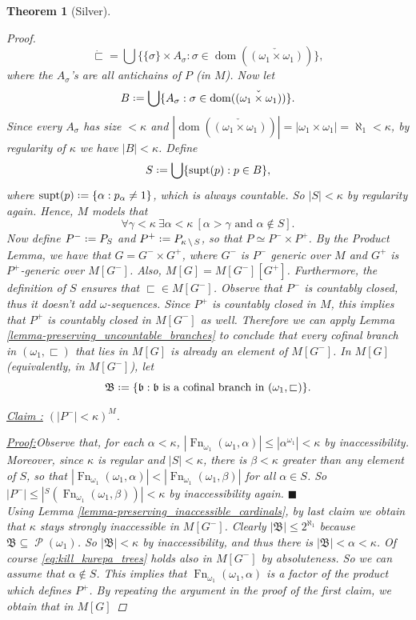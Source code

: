 \documentclass[11pt,a4paper]{report}
\newtheorem{theorem}{Theorem}[chapter] %
\theoremstyle{definition}
\theoremstyle{num.custom-title}
\theoremstyle{custom-title}
\newenvironment{claim}[1]{\par\noindent\underline{Claim#1:}\space}{} %
\newenvironment{claimproof}[1]{\par\noindent\underline{Proof:}\space#1}{\leavevmode\unskip\penalty9999 \hbox{}\nobreak\hfill\quad\hbox{$\blacksquare$}} %
\DeclareMathOperator{\dom}{dom}
\DeclareMathOperator{\PP}{\mathcal{P}}
\DeclareMathOperator{\sm}{\setminus}
\DeclareMathOperator{\sse}{\subseteq}
\DeclareMathOperator{\Fn}{Fn}
\newcommand*{\defeq}{\mathrel{\rlap{%
                     \raisebox{0.3ex}{$\cdot$}}%
                     \raisebox{-0.3ex}{$\cdot$}}%
                     =}
\begin{document}
\begin{theorem}[Silver]
\begin{proof}
\[
\dot{\sqsubset} = 
\bigcup \big\{ \{\sigma\} \times A_\sigma : \sigma \in \dom(\check{(\omega_1 \times \omega_1)}) \big\},
\]
where the $A_\sigma$'s are all antichains of $P$ (in $M$). Now let 
\[
B \defeq \bigcup \{A_\sigma : \sigma \in \dom(\check{(\omega_1 \times \omega_1)}) \}.
\]
Since every $A_\sigma$ has size $<\kappa$ and $|\dom(\check{(\omega_1 \times \omega_1)})| = |\omega_1 \times \omega_1| = \aleph_1 < \kappa$, by regularity of $\kappa$ we have $|B| < \kappa$. Define
\[
S \defeq \bigcup \{ \supt(p) : p \in B \},
\]
where $\supt(p) \defeq \{\alpha : p_\alpha \neq 1\}$, which is always countable. So $|S| < \kappa$ by regularity again. Hence, $M$ models that
\begin{equation}\label{eq:kill_kurepa_trees}
\forall \gamma < \kappa \ \exists \alpha < \kappa \ [\alpha > \gamma \text{ and } \alpha \not\in S].
\end{equation}
Now define $P^- \defeq P_S$ and $P^+ \defeq P_{\kappa \sm S}$, so that $P \simeq P^- \times P^+$. By the Product Lemma, we have that $G = G^- \times G^+$, where $G^-$ is $P^-$ generic over $M$ and $G^+$ is $P^+$-generic over $M[G^-]$. Also, $M[G] = M[G^-][G^+]$. Furthermore, the definition of $S$ ensures that ${\sqsubset} \in M[G^-]$. Observe that $P^-$ is countably closed, thus it doesn't add $\omega$-sequences. Since $P^+$ is countably closed in $M$, this implies that $P^+$ is countably closed in $M[G^-]$ as well. Therefore we can apply Lemma \ref{lemma-preserving_uncountable_branches} to conclude that every cofinal branch in $(\omega_1,\sqsubset)$ that lies in $M[G]$ is already an element of $M[G^-]$. In $M[G]$ (equivalently, in $M[G^-]$), let
\[
\mathfrak{B} \defeq \{ \mathfrak{b} : \mathfrak{b} \text{ is a cofinal branch in } (\omega_1,\sqsubset) \}.
\]
\begin{claim}{ }
$(|P^-| < \kappa)^M$.
\begin{claimproof}
Observe that, for each $\alpha < \kappa$, $|\Fn_{\omega_1}(\omega_1,\alpha)| \leq |\alpha^{\omega_1}| < \kappa$ by inaccessibility. Moreover, since $\kappa$ is regular and $|S| < \kappa$, there is $\beta < \kappa$ greater than any element of $S$, so that $|\Fn_{\omega_1}(\omega_1,\alpha)| < |\Fn_{\omega_1}(\omega_1,\beta)|$ for all $\alpha \in S$. So $|P^-| \leq |{^S}(\Fn_{\omega_1}(\omega_1,\beta))| < \kappa$ by inaccessibility again.
\end{claimproof}
\end{claim}\\[6pt]
Using Lemma \ref{lemma-preserving_inaccessible_cardinals}, by last claim we obtain that $\kappa$ stays strongly inaccessible in $M[G^-]$. Clearly $|\mathfrak{B}| \leq 2^{\aleph_1}$ because $\mathfrak{B} \sse \PP(\omega_1)$. So $|\mathfrak{B}| < \kappa$ by inaccessibility, and thus there is $|\mathfrak{B}| < \alpha < \kappa$. Of course \eqref{eq:kill_kurepa_trees} holds also in $M[G^-]$ by absoluteness. So we can assume that $\alpha \not\in S$. This implies that $\Fn_{\omega_1} (\omega_1, \alpha)$ is a factor of the product which defines $P^+$. By repeating the argument in the proof of the first claim, we obtain that in $M[G]$

\end{proof}
\end{theorem}
\end{document}
